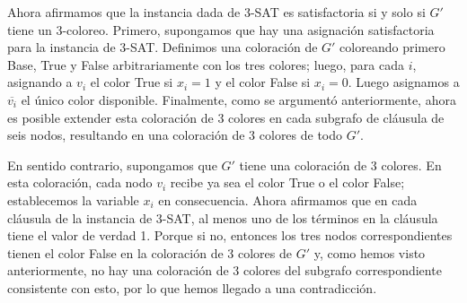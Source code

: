 \documentclass[9pt]{article}
\begin{document}
        Ahora afirmamos que la instancia dada de 3-SAT es satisfactoria si y solo si \( G' \) tiene un 3-coloreo. Primero, supongamos que hay una asignación satisfactoria para la instancia de 3-SAT. Definimos una coloración de \( G' \) coloreando primero Base, True y False arbitrariamente con los tres colores; luego, para cada \( i \), asignando a \( v_i \) el color True si \( x_i = 1 \) y el color False si \( x_i = 0 \). Luego asignamos a \( \overline{v_i} \) el único color disponible. Finalmente, como se argumentó anteriormente, ahora es posible extender esta coloración de 3 colores en cada subgrafo de cláusula de seis nodos, resultando en una coloración de 3 colores de todo \( G' \).

        En sentido contrario, supongamos que \( G' \) tiene una coloración de 3 colores. En esta coloración, cada nodo \( v_i \) recibe ya sea el color True o el color False; establecemos la variable \( x_i \) en consecuencia. Ahora afirmamos que en cada cláusula de la instancia de 3-SAT, al menos uno de los términos en la cláusula tiene el valor de verdad 1. Porque si no, entonces los tres nodos correspondientes tienen el color False en la coloración de 3 colores de \( G' \) y, como hemos visto anteriormente, no hay una coloración de 3 colores del subgrafo correspondiente consistente con esto, por lo que hemos llegado a una contradicción.
\end{document}
